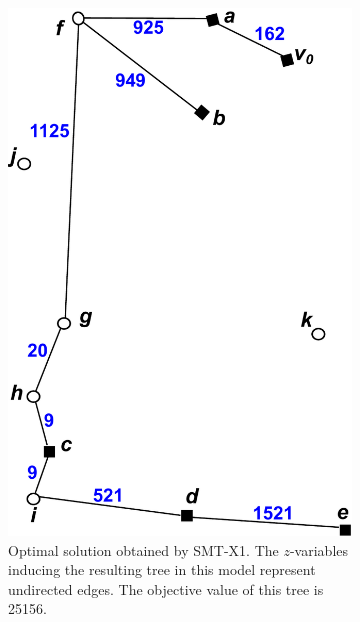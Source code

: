 \begin{figure}[!htb]
    \centering
    \begin{subfigure}[b]{0.4\textwidth}
        \includegraphics[width=\textwidth]{conBNec}
        \caption{Optimal solution obtained by SMT-X1. The $z$-variables inducing the resulting tree in this model represent undirected edges. The objective value of this tree is 25156.}
        \label{fig:BorigSMT}
    \end{subfigure}
    \hfill %
    \begin{subfigure}[b]{0.4\textwidth}

\end{subfigure}
\end{figure}
